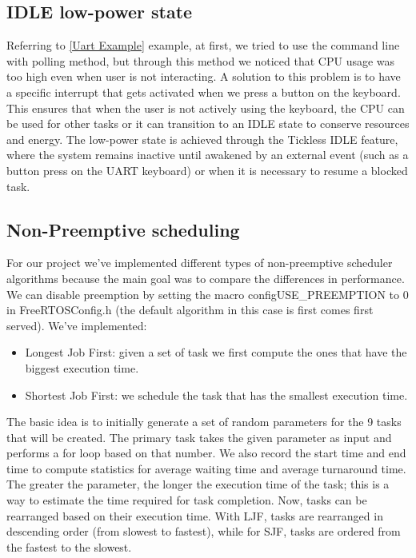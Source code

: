 \subsection{IDLE low-power state} 
Referring to \ref{Uart Example} example, at first, we tried to use the command line with polling method, but through this method we noticed that CPU usage was too high even when user is not interacting. 
A solution to this problem is to have a specific interrupt that gets activated when we press a button on the keyboard. This ensures that when the
user is not actively using the keyboard, the CPU can be used for other tasks or it can transition to an IDLE state to conserve resources and energy. The low-power state is achieved through the Tickless IDLE feature, where the system remains inactive until awakened by an external event (such as a button press on the UART keyboard) or when it is necessary to resume a blocked task.

\subsection{Non-Preemptive scheduling}
For our project we've implemented different types of non-preemptive scheduler algorithms because the main goal was to compare the differences in performance. We can disable preemption by setting the macro configUSE\_PREEMPTION to 0 in FreeRTOSConfig.h (the default algorithm in this case is first comes first served). We've implemented:
\begin{itemize}
    \item Longest Job First: given a set of task we first compute the ones that have the biggest execution time.
    \item Shortest Job First: we schedule the task that has the smallest execution time.
\end{itemize}
The basic idea is to initially generate a set of random parameters for the 9 tasks that will be created.
The primary task takes the given parameter as input and performs a for loop based on that number. We also record the start time and end time to compute statistics for average waiting time and average turnaround time.
The greater the parameter, the longer the execution time of the task; this is a way to estimate the time required for task completion.
Now, tasks can be rearranged based on their execution time.
With LJF, tasks are rearranged in descending order (from slowest to fastest), while for SJF, tasks are ordered from the fastest to the slowest.



